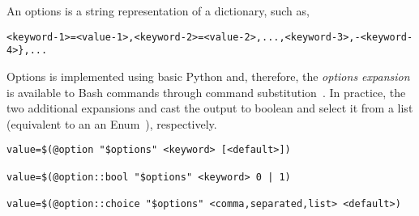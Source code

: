 
An options is a string representation of a dictionary, such as,
%
\begin{verbatim}
<keyword-1>=<value-1>,<keyword-2>=<value-2>,...,<keyword-3>,-<keyword-4>},...
\end{verbatim}
%
Options is implemented using basic Python and, therefore, the \emph{options expansion} is available to Bash commands through command substitution~\cite{command_substitution}. In practice, the two additional expansions  and  cast the output to boolean and select it from a list (equivalent to an an Enum~\cite{python_eunum}), respectively.
%
\begin{verbatim}
value=$(@option "$options" <keyword> [<default>])

value=$(@option::bool "$options" <keyword> 0 | 1)

value=$(@option::choice "$options" <comma,separated,list> <default>)
\end{verbatim}
